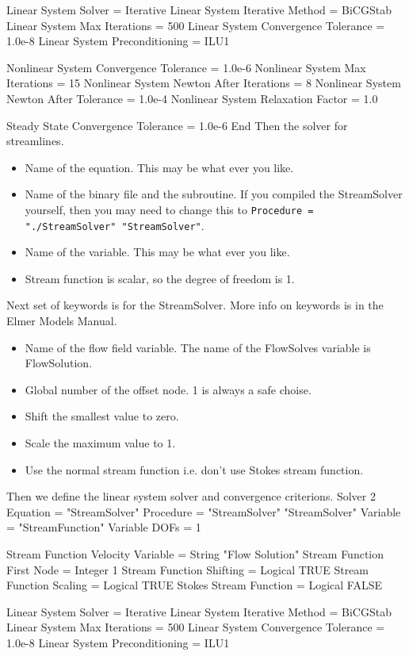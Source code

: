   Linear System Solver = Iterative
  Linear System Iterative Method = BiCGStab
  Linear System Max Iterations = 500
  Linear System Convergence Tolerance = 1.0e-8
  Linear System Preconditioning = ILU1

  Nonlinear System Convergence Tolerance = 1.0e-6
  Nonlinear System Max Iterations = 15
  Nonlinear System Newton After Iterations = 8
  Nonlinear System Newton After Tolerance = 1.0e-4
  Nonlinear System Relaxation Factor = 1.0

  Steady State Convergence Tolerance = 1.0e-6
End
\ttend
Then the solver for streamlines.
\begin{itemize}
\item Name of the equation. This may be what ever you like.
\item Name of the binary file and the subroutine. If you compiled the StreamSolver yourself,
then you may need to change this to \texttt{Procedure = "./StreamSolver" "StreamSolver"}.
\item Name of the variable. This may be what ever you like.
\item Stream function is scalar, so the degree of freedom is 1.
\end{itemize}
Next set of keywords is for the StreamSolver. More info on keywords is in the Elmer
Models Manual.
\begin{itemize}
\item Name of the flow field variable. The name of the FlowSolves variable is FlowSolution.
\item Global number of the offset node. 1 is always a safe choise.
\item Shift the smallest value to zero.
\item Scale the maximum value to 1.
\item Use the normal stream function i.e. don't use Stokes stream function.
\end{itemize}
Then we define the linear system solver and convergence criterions.
\ttbegin
Solver 2
  Equation = "StreamSolver"
  Procedure = "StreamSolver" "StreamSolver"
  Variable = "StreamFunction"
  Variable DOFs = 1

  Stream Function Velocity Variable = String "Flow Solution"
  Stream Function First Node = Integer 1
  Stream Function Shifting = Logical TRUE
  Stream Function Scaling = Logical TRUE
  Stokes Stream Function = Logical FALSE

  Linear System Solver = Iterative
  Linear System Iterative Method = BiCGStab
  Linear System Max Iterations = 500
  Linear System Convergence Tolerance = 1.0e-8
  Linear System Preconditioning = ILU1

